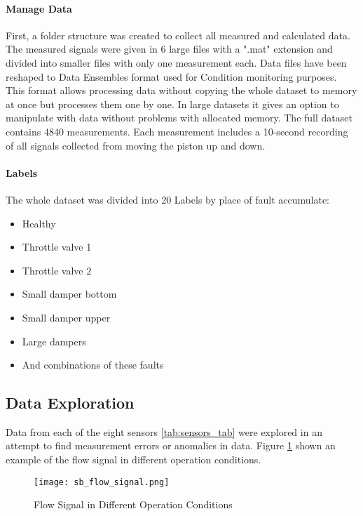 \paragraph{Manage Data}

First, a folder structure was created to collect all measured and
calculated data. The measured signals were given in 6 large files with a
".mat" extension and divided into smaller files with only one measurement
each.  Data files have been reshaped to Data Ensembles \cite{data_ensemble}
format used for Condition monitoring purposes. This format allows
processing data without copying the whole dataset to memory at once but
processes them one by one. In large datasets it gives an option to
manipulate with data without problems with allocated memory.  The full
dataset contains 4840 measurements. Each measurement includes a 10-second
recording of all signals collected from moving the piston up and down.

\paragraph{Labels}
The whole dataset was divided into 20 Labels by place of fault accumulate: 
\begin{itemize}
    \item Healthy
    \item Throttle valve 1
    \item Throttle valve 2 
    \item Small damper bottom
    \item Small damper upper
    \item Large dampers 
    \item And combinations of these faults
\end{itemize}

\subsection{Data Exploration}
Data from each of the eight sensors \ref{tab:sensors_tab} were explored in an attempt to find
measurement errors or anomalies in data.  Figure \ref{fig:flow_sig} shown
an example of the flow signal in different operation conditions. 

\begin{figure}[h!]
    \centering
    \texttt{[image: sb\_flow\_signal.png]}
    \caption{Flow Signal in Different Operation Conditions}
    \label{fig:flow_sig}
\end{figure}


